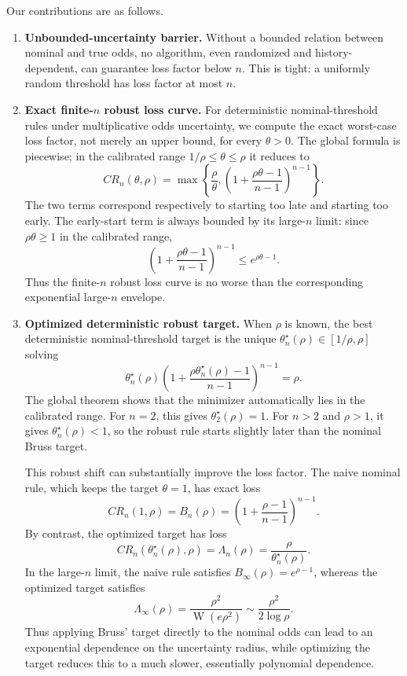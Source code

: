 \documentclass[11pt,a4paper]{article}
\DeclareMathOperator{\LambertW}{W}
\begin{document}
Our contributions are as follows.

\begin{enumerate}[label=(\arabic*)]
\item \textbf{Unbounded-uncertainty barrier.}
  Without a bounded relation between nominal and true odds, no algorithm, even
  randomized and history-dependent, can guarantee loss factor below \(n\).  This
  is tight: a uniformly random threshold has loss factor at most \(n\).

\item \textbf{Exact finite-\(n\) robust loss curve.}
  For deterministic nominal-threshold rules under multiplicative odds
  uncertainty,
  we compute the exact worst-case loss factor, not merely an upper bound, for
  every \(\theta>0\).  The global formula is piecewise; in the calibrated range
  \(1/\rho\le\theta\le\rho\) it reduces to
  \[
    CR_n(\theta,\rho)
    =
    \max\left\{
      \frac{\rho}{\theta},
      \left(1+\frac{\rho\theta-1}{n-1}\right)^{n-1}
    \right\}.
  \]
  The two terms correspond respectively to starting too late and starting too
  early.  The early-start term is always bounded by its large-\(n\) limit:
  since \(\rho\theta\ge1\) in the calibrated range,
  \[
    \left(1+\frac{\rho\theta-1}{n-1}\right)^{n-1}
    \le
    e^{\rho\theta-1}.
  \]
  Thus the finite-\(n\) robust loss curve is no worse than the corresponding
  exponential large-\(n\) envelope.

\item \textbf{Optimized deterministic robust target.}
  When \(\rho\) is known, the best deterministic nominal-threshold
  target is the unique \(\theta_n^\star(\rho)\in[1/\rho,\rho]\) solving
  \[
    \theta_n^\star(\rho)
    \left(1+\frac{\rho\theta_n^\star(\rho)-1}{n-1}\right)^{n-1}
    =
    \rho.
  \]
  The global theorem shows that the minimizer automatically lies in the
  calibrated range.  For \(n=2\), this gives \(\theta_2^\star(\rho)=1\).  For
  \(n>2\) and \(\rho>1\), it gives \(\theta_n^\star(\rho)<1\), so the robust
  rule starts slightly later than the nominal Bruss target.

  This robust shift can substantially improve the loss factor.  The naive
  nominal rule, which keeps the target \(\theta=1\), has exact loss
  \[
    CR_n(1,\rho)
    =
    B_n(\rho)
    =
    \left(1+\frac{\rho-1}{n-1}\right)^{n-1}.
  \]
  By contrast, the optimized target has loss
  \[
    CR_n(\theta_n^\star(\rho),\rho)
    =
    \Lambda_n(\rho)
    =
    \frac{\rho}{\theta_n^\star(\rho)}.
  \]
  In the large-\(n\) limit, the naive rule satisfies
  \(B_\infty(\rho)=e^{\rho-1}\), whereas the optimized target satisfies
  \[
    \Lambda_\infty(\rho)
    =
    \frac{\rho^2}{\LambertW(e\rho^2)}
    \sim
    \frac{\rho^2}{2\log\rho}.
  \]
  Thus applying Bruss' target directly to the nominal odds can lead to an
  exponential dependence on the uncertainty radius, while optimizing the target
  reduces this to a much slower, essentially polynomial dependence.


\end{enumerate}
\end{document}
